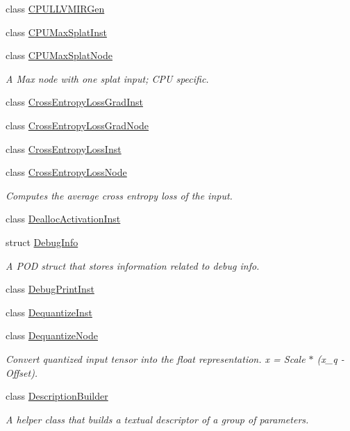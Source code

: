\begin{DoxyCompactItemize}
class \hyperlink{classglow_1_1_c_p_u_l_l_v_m_i_r_gen}{C\+P\+U\+L\+L\+V\+M\+I\+R\+Gen}
\item 
class \hyperlink{classglow_1_1_c_p_u_max_splat_inst}{C\+P\+U\+Max\+Splat\+Inst}
\item 
class \hyperlink{classglow_1_1_c_p_u_max_splat_node}{C\+P\+U\+Max\+Splat\+Node}
\begin{DoxyCompactList}\small\item\em A Max node with one splat input; C\+PU specific. \end{DoxyCompactList}\item 
class \hyperlink{classglow_1_1_cross_entropy_loss_grad_inst}{Cross\+Entropy\+Loss\+Grad\+Inst}
\item 
class \hyperlink{classglow_1_1_cross_entropy_loss_grad_node}{Cross\+Entropy\+Loss\+Grad\+Node}
\item 
class \hyperlink{classglow_1_1_cross_entropy_loss_inst}{Cross\+Entropy\+Loss\+Inst}
\item 
class \hyperlink{classglow_1_1_cross_entropy_loss_node}{Cross\+Entropy\+Loss\+Node}
\begin{DoxyCompactList}\small\item\em Computes the average cross entropy loss of the input. \end{DoxyCompactList}\item 
class \hyperlink{classglow_1_1_dealloc_activation_inst}{Dealloc\+Activation\+Inst}
\item 
struct \hyperlink{structglow_1_1_debug_info}{Debug\+Info}
\begin{DoxyCompactList}\small\item\em A P\+OD struct that stores information related to debug info. \end{DoxyCompactList}\item 
class \hyperlink{classglow_1_1_debug_print_inst}{Debug\+Print\+Inst}
\item 
class \hyperlink{classglow_1_1_dequantize_inst}{Dequantize\+Inst}
\item 
class \hyperlink{classglow_1_1_dequantize_node}{Dequantize\+Node}
\begin{DoxyCompactList}\small\item\em Convert quantized input tensor into the float representation. x = Scale $\ast$ (x\+\_\+q -\/ Offset). \end{DoxyCompactList}\item 
class \hyperlink{classglow_1_1_description_builder}{Description\+Builder}
\begin{DoxyCompactList}\small\item\em A helper class that builds a textual descriptor of a group of parameters. \end{DoxyCompactList}\item 

\end{DoxyCompactItemize}
